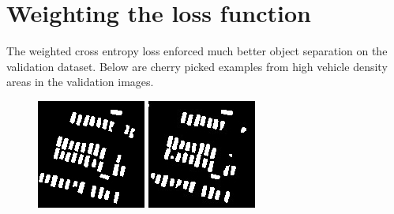 \documentclass{kththesis}
\begin{document}
\section{Weighting the loss function}
The weighted cross entropy loss enforced much better object separation on the validation dataset. Below are cherry picked examples from high vehicle density areas in the validation images.
\begin{figure}[H]
\centering
{}
  \includegraphics[width=\linewidth]{class_vs_w/label_1}
\endminipage\hfill
{}
  \includegraphics[width=\linewidth]{class_vs_w/un_weight_1}

\end{figure}
\end{document}

